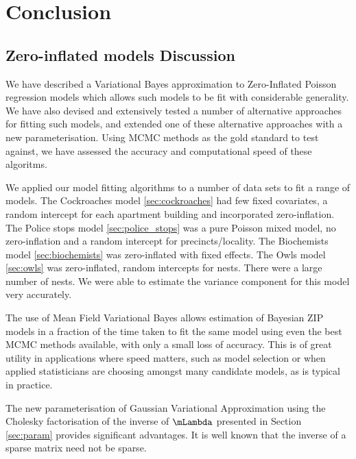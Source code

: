 \chapter{Conclusion}

\section{Zero-inflated models Discussion}
\label{sec:discussion}
		
We have described a Variational Bayes approximation to Zero-Inflated Poisson regression models which
allows such models to be fit with considerable generality. We have also devised and extensively tested a
number of alternative approaches for fitting such models, and extended one of these alternative
approaches with a new parameterisation. Using MCMC methods as the gold standard to test against, we have
assessed the accuracy and computational speed of these algoritms.
		
We applied our model fitting algorithms to a number of data sets to fit a range of models. The Cockroaches
model \ref{sec:cockroaches} had few fixed covariates, a random intercept for each apartment building and
incorporated zero-inflation. The Police stops model \ref{sec:police_stops} was a pure Poisson mixed model, no
zero-inflation and a random intercept for precincts/locality. The Biochemists model \ref{sec:biochemists} was
zero-inflated with fixed effects. The Owls model \ref{sec:owls} was zero-inflated, random intercepts for
nests. There were a large number of nests. We were able to estimate the variance component for this model very
accurately.

The use of Mean Field Variational Bayes allows estimation of Bayesian ZIP models in a fraction of the
time taken to fit the same model using even the best MCMC methods available, with only a small loss of
accuracy. This is of great utility in applications where speed matters, such as model selection or when
applied statisticians are choosing amongst many candidate models, as is typical in practice.
		
The new parameterisation of Gaussian Variational Approximation using the Cholesky factorisation of the
inverse of $\mLambda$ presented in Section \ref{sec:param} provides significant advantages.  It is well
known that the inverse of a sparse matrix need not be sparse.

